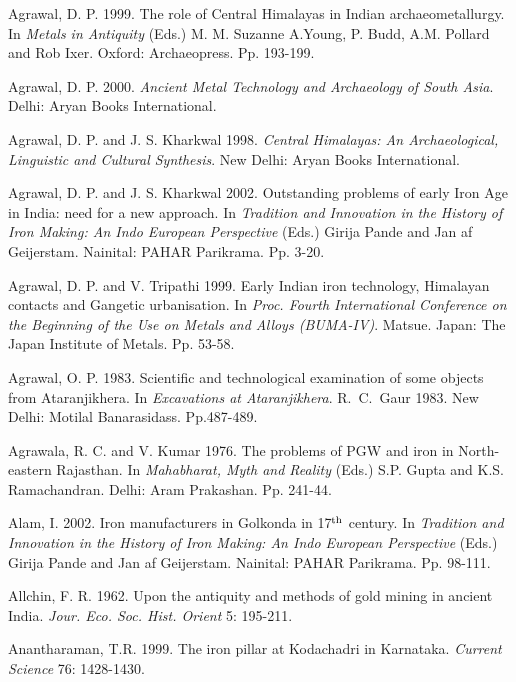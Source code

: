 \begin{thebibliography}{99}
\itemsep=0pt

  Agrawal, D. P. 1999. The role of Central Himalayas in Indian archaeometallurgy. In \textit{Metals in Antiquity} (Eds.) M. M. Suzanne A.Young, P. Budd, A.M. Pollard and Rob Ixer. Oxford: Archaeopress. Pp. 193-199.

 Agrawal, D. P. 2000. \textit{Ancient Metal Technology and Archaeology of South Asia}. Delhi: Aryan Books International.

 Agrawal, D. P. and J. S. Kharkwal 1998. \textit{Central Himalayas: An Archaeological, Linguistic and Cultural Synthesis}. New Delhi: Aryan Books International.

 Agrawal, D. P. and J. S. Kharkwal 2002. Outstanding problems of early Iron Age in India: need for a new approach. In \textit {Tradition and Innovation in the History of Iron Making: An Indo European Perspective} (Eds.) Girija Pande and Jan af Geijerstam. Nainital: PAHAR Parikrama. Pp. 3-20.

 Agrawal, D. P. and V. Tripathi 1999. Early Indian iron technology, Himalayan contacts and Gangetic urbanisation. In \textit{Proc. Fourth International Conference on the Beginning of the Use on Metals and Alloys (BUMA-IV)}. Matsue. Japan: The Japan Institute of Metals. Pp. 53-58.

 Agrawal, O. P. 1983. Scientific and technological examination of some objects from Ataranjikhera. In \textit{Excavations at Ataranjikhera}. R.~C.~Gaur 1983. New Delhi: Motilal Banarasidass. Pp.487-489.

 Agrawala, R. C. and V. Kumar 1976. The problems of PGW and iron in North-eastern Rajasthan. In \textit{Mahabharat, Myth and Reality} (Eds.) S.P. Gupta and K.S. Ramachandran. Delhi: Aram Prakashan. Pp. 241-44. 

 Alam, I. 2002. Iron manufacturers in Golkonda in 17$^{\rm th}$ century. In \textit{Tradition and Innovation in the History of Iron Making: An Indo European Perspective} (Eds.) Girija Pande and Jan af Geijerstam.  Nainital: PAHAR Parikrama. Pp. 98-111.

 Allchin, F. R. 1962. Upon the antiquity and methods of gold mining in ancient India. \textit{Jour. Eco. Soc. Hist. Orient} 5: 195-211.

 Anantharaman, T.R. 1999. The iron pillar at Kodachadri in Karnataka. \textit{Current Science} 76: 1428-1430.


\end{thebibliography}
